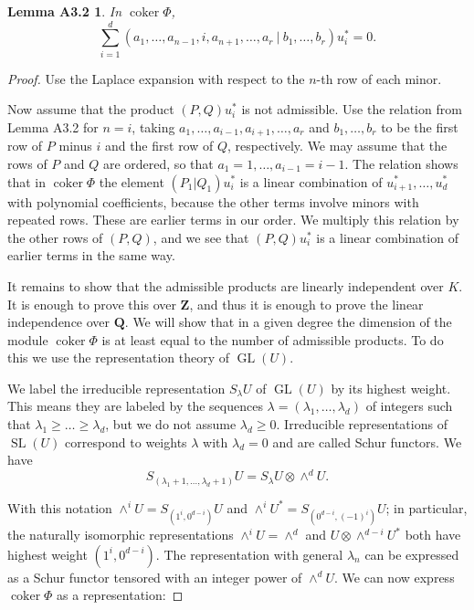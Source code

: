 \documentclass{tran-l}
\theoremstyle{plain}
\newtheorem*{theorem20}{Lemma A3.2}
\theoremstyle{remark}
\theoremstyle{definition}
\newcommand{\GL}{\operatorname{GL}}
\newcommand{\SL}{\operatorname{SL}}
\newcommand{\coker}{\operatorname{coker}}
\begin{document}
\begin{theorem20} In $\coker \Phi $, 
\begin{equation*}\sum _{i=1}^{d} 
(a_{1} ,\ldots ,a_{n-1} ,i, a_{n+1},\ldots ,a_{r} \ |\ b_{1},\ldots ,b_{r} )
u_{i}^{*} =0.
\end{equation*}
\end{theorem20}
\begin{proof} Use the Laplace expansion with respect to the
$n$-th row of each minor.

Now assume that the product $(P, Q)u_{i}^{*}$ is not admissible. Use the
relation from Lemma A3.2 for $n=i$, taking $a_{1} ,\ldots ,a_{i-1},
a_{i+1},\ldots ,a_{r}$  and  $b_{1},\ldots ,b_{r}$  to be the first row of $P$
minus $i$ and the first row of $Q$, respectively.  We may assume that the rows
of $P$ and $Q$ are ordered, so that $a_{1} =1,\ldots , a_{i-1}=i-1$. The
relation shows that in $\coker \Phi $ the element $(P_{1}|Q_{1})u_{i}^{*}$ is a
linear combination of $u_{i+1}^{*}, \ldots ,u_{d}^{*}$ with polynomial
coefficients, because the other terms involve minors with repeated rows. These
are earlier terms in our order.  We multiply this  relation by the other rows
of $(P, Q)$, and we see that $(P, Q)u_{i}^{*}$ is a linear combination of
earlier terms in the same way.
  
It remains to show that the admissible products are linearly independent over
$K$. It is enough to prove this over $\mathbf{Z}$, and thus it is enough to
prove the linear independence over $\mathbf{Q}$. We will show that in a given
degree the dimension of the module $\coker \Phi $ is at least equal to the
number of admissible products.  To do this we use the representation theory of
$\GL(U)$. 

We label the irreducible
representation $S_{\lambda }U$ of $\GL(U)$ by its highest weight. This
means they are labeled by the sequences $\lambda = (\lambda _{1} ,\ldots
,\lambda _{d} )$ of integers such that $\lambda _{1}\ge \ldots \ge \lambda
_{d}$,
but we do not assume $\lambda _{d}\ge 0$. Irreducible representations of
$\SL(U)$ correspond to weights $\lambda $ with $\lambda _{d} =0$ and are
called Schur functors. We have
\begin{equation*}S_{(\lambda _{1} +1,\ldots ,\lambda _{d} +1 )}U
= 
S_{\lambda }U\otimes \wedge ^{d} U.
\end{equation*}

With this notation $\wedge ^{i} U = S_{(1^{i} ,0^{d-i})}U$ and
$\wedge ^{i} U^{*} = S_{(0^{d-i}, (-1)^{i} )}U$; in particular,
the naturally isomorphic representations $\wedge ^{i} U=\wedge ^{d} $ and
$U\otimes \wedge ^{d-i}U^{*}$ both have highest weight $(1^{i} ,0^{d-i})$.
The representation with general $\lambda _{n}$
can be expressed as a Schur functor tensored with an
integer
power of $\wedge ^{d} U$. We can now express
$\coker \Phi $ as a representation:


\end{proof}
\end{document}
